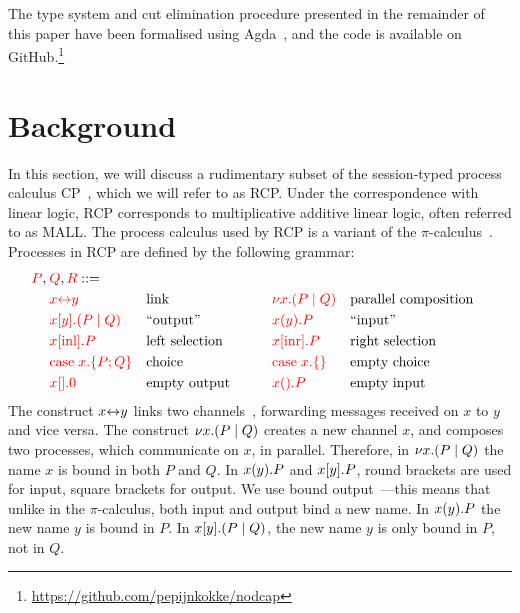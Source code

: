 \documentclass[a4paper,UKenglish]{lipics-v2016}
\begin{document}
The type system and cut elimination procedure presented in the remainder of this
paper have been formalised using Agda~\cite{norell2009}, and the code is
available on GitHub.\footnote{%
  \url{https://github.com/pepijnkokke/nodcap}
}

\section{Background}
In this section, we will discuss a rudimentary subset of the session-typed
process calculus CP~\cite{wadler2012}, which we will refer to as RCP.
Under the correspondence with linear logic, RCP corresponds to multiplicative
additive linear logic, often referred to as MALL.
The process calculus used by RCP is a variant of the
$\pi$-calculus~\cite{milner1992b}. Processes in RCP are defined by
the following grammar:
\[
  \begin{aligned}
    \red{P},\:&\red{Q},\red{R} ::=\\
    &       \red{\link{x}{y}}           &&\text{link}
    &\qquad&\red{\cut{x}(P \mid Q)}     &&\text{parallel composition}\\
    &       \red{\send{x}{y}(P \mid Q)} &&\text{``output''}
    &\qquad&\red{\recv{x}{y}P}          &&\text{``input''}\\
    &       \red{\inl{x}P}              &&\text{left selection}
    &\qquad&\red{\inr{x}P}              &&\text{right selection}\\
    &       \red{\case{x}{P}{Q}}        &&\text{choice}
    &\qquad&\red{\case{x}{}{}}          &&\text{empty choice}\\
    &       \red{\send{x}{}0}           &&\text{empty output}
    &\qquad&\red{\recv{x}{}P}           &&\text{empty input}\\
  \end{aligned}
\]
The construct ${x{\leftrightarrow}y}$ links two channels~\cite{sangiorgi1996,boreale1998},
forwarding messages received on $x$ to $y$ and vice versa.
%
The construct ${\nu x.}{(P \mid Q)}$ creates a new channel $x$, and composes two
processes, which communicate on $x$, in parallel.
Therefore, in ${\nu x.}{(P \mid Q)}$ the name $x$ is bound in both $P$ and $Q$.
%
In ${x(y).}P$ and ${x[y].}P$, round brackets are used for input, square
brackets for output.
We use bound output~\cite{sangiorgi1996}---this means that unlike in the
$\pi$-calculus, both input and output bind a new name.
In ${x(y).}P$ the new name $y$ is bound in $P$.
In ${x[y].}{(P \mid Q)}$, the new name $y$ is only bound in $P$, not in $Q$.
\end{document}
